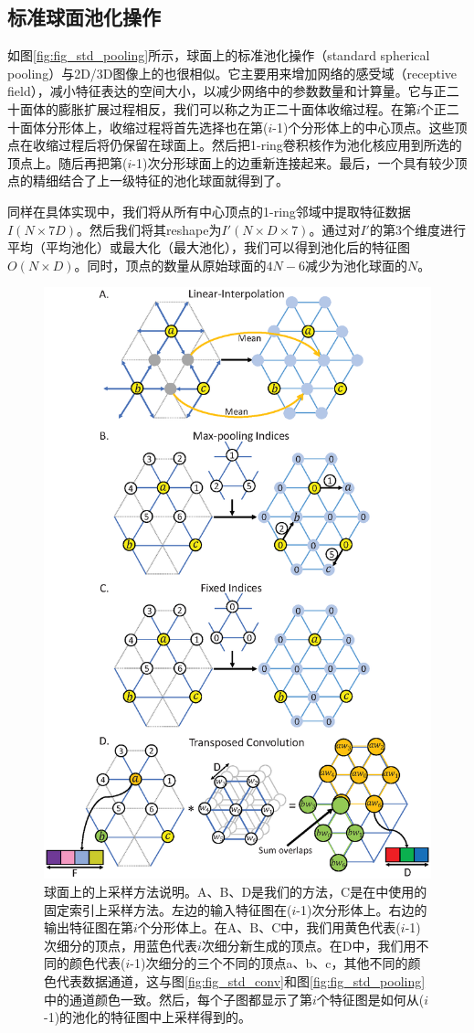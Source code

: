 \subsection{标准球面池化操作}
如图\ref{fig:fig_std_pooling}所示，球面上的标准池化操作（standard spherical pooling）与2D/3D图像上的也很相似。它主要用来增加网络的感受域（receptive field），减小特征表达的空间大小，以减少网络中的参数数量和计算量。它与正二十面体的膨胀扩展过程相反，我们可以称之为正二十面体收缩过程。在第$i$个正二十面体分形体上，收缩过程将首先选择也在第($i$-1)个分形体上的中心顶点。这些顶点在收缩过程后将仍保留在球面上。然后把1-ring卷积核作为池化核应用到所选的顶点上。随后再把第($i$-1)次分形球面上的边重新连接起来。最后，一个具有较少顶点的精细结合了上一级特征的池化球面就得到了。

同样在具体实现中，我们将从所有中心顶点的1-ring邻域中提取特征数据$I(N\times 7D)$。然后我们将其reshape为$I'(N\times D\times7)$。通过对$I'$的第3个维度进行平均（平均池化）或最大化（最大池化），我们可以得到池化后的特征图$O(N\times D)$。同时，顶点的数量从原始球面的$4N-6$减少为池化球面的$N$。


\begin{figure}[t]
	\centering
	\includegraphics[width=0.52\linewidth]{figure/figure_upsampling_layer.eps}
	\caption{球面上的上采样方法说明。A、B、D是我们的方法，C是在\cite{jiang2018spherical,parvathaneni2019cortical}中使用的固定索引上采样方法。左边的输入特征图在($i$-1)次分形体上。右边的输出特征图在第$i$个分形体上。在A、B、C中，我们用黄色代表($i$-1)次细分的顶点，用蓝色代表$i$次细分新生成的顶点。在D中，我们用不同的颜色代表($i$-1)次细分的三个不同的顶点a、b、c，其他不同的颜色代表数据通道，这与图\ref{fig:fig_std_conv}和图\ref{fig:fig_std_pooling}中的通道颜色一致。然后，每个子图都显示了第$i$个特征图是如何从($i$-1)的池化的特征图中上采样得到的。}
	\label{fig:fig_upsampling}
\end{figure}


